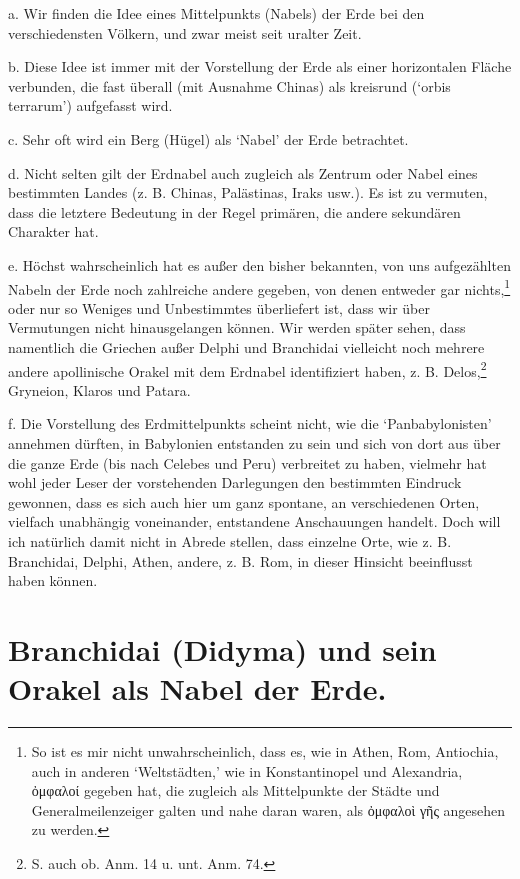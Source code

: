 \documentclass[a4paper, 11pt, oneside]{article}
\begin{document}
a. Wir finden die Idee eines Mittelpunkts (Nabels) der Erde bei den verschiedensten Völkern, und zwar meist seit uralter Zeit.

b. Diese Idee ist immer mit der Vorstellung der Erde als einer horizontalen Fläche verbunden, die fast überall (mit Ausnahme Chinas) als kreisrund (`orbis terrarum') aufgefasst wird.

c. Sehr oft wird ein Berg (Hügel) als `Nabel' der Erde betrachtet.

d. Nicht selten gilt der Erdnabel auch zugleich als Zentrum oder Nabel eines bestimmten Landes (z. B. Chinas, Palästinas, Iraks usw.). Es ist zu vermuten, dass die letztere Bedeutung in der Regel primären, die andere sekundären Charakter hat.

e. Höchst wahrscheinlich hat es außer den bisher bekannten, von uns aufgezählten Nabeln der Erde noch zahlreiche andere gegeben, von denen entweder gar nichts,\footnote{So ist es mir nicht unwahrscheinlich, dass es, wie in Athen, Rom, Antiochia, auch in anderen `Weltstädten,' wie in Konstantinopel und Alexandria, ὀμφαλοί gegeben hat, die zugleich als Mittelpunkte der Städte und Generalmeilenzeiger galten und nahe daran waren, als ὀμφαλοὶ γῆς angesehen zu werden.} oder nur so Weniges und Unbestimmtes überliefert ist, dass wir über Vermutungen nicht hinausgelangen können. Wir werden später sehen, dass namentlich die Griechen außer Delphi und Branchidai vielleicht noch mehrere andere apollinische Orakel mit dem Erdnabel identifiziert haben, z. B. Delos,\footnote{S. auch ob. Anm. 14 u. unt. Anm. 74.} Gryneion, Klaros und Patara.

f. Die Vorstellung des Erdmittelpunkts scheint nicht, wie die `Panbabylonisten' annehmen dürften, in Babylonien entstanden zu sein und sich von dort aus über die ganze Erde (bis nach Celebes und Peru) verbreitet zu haben, vielmehr hat wohl jeder Leser der vorstehenden Darlegungen den bestimmten Eindruck gewonnen, dass es sich auch hier um ganz spontane, an verschiedenen Orten, vielfach unabhängig voneinander, entstandene Anschauungen handelt. Doch will ich natürlich damit nicht in Abrede stellen, dass einzelne Orte, wie z. B. Branchidai, Delphi, Athen, andere, z. B. Rom, in dieser Hinsicht beeinflusst haben können.
\clearpage
\section{Branchidai (Didyma) und sein Orakel als Nabel der Erde.}
\end{document}
